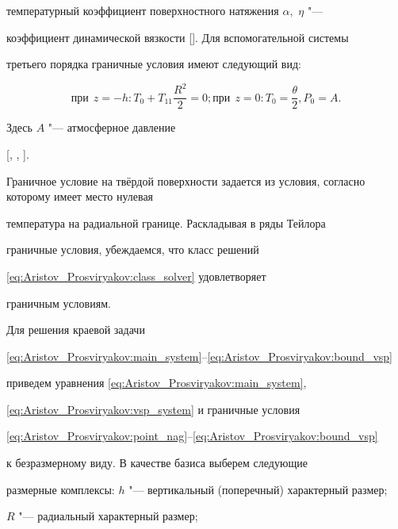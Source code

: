 температурный коэффициент поверхностного натяжения $\alpha,$ $\eta$ "---

коэффициент динамической вязкости []. Для вспомогательной системы

третьего порядка граничные условия имеют следующий вид:

\begin{equation}

\text{при} \ \ z=-h: T_0+T_{11}\frac{R^2}{2}=0;

\text{при} \ \ z=0: T_0=\frac{\theta}{2}, P_0=A.

\label{eq:Aristov_Prosviryakov:bound_vsp}

\end{equation}

Здесь $A$ "--- атмосферное давление

[, , ].

Граничное условие на твёрдой поверхности задается из условия, согласно которому имеет место нулевая

температура на радиальной границе. Раскладывая в ряды Тейлора

граничные условия, убеждаемся, что класс решений

\eqref{eq:Aristov_Prosviryakov:class_solver} удовлетворяет

граничным условиям.



\smallskip



 Для решения краевой задачи

\eqref{eq:Aristov_Prosviryakov:main_system}--\eqref{eq:Aristov_Prosviryakov:bound_vsp}

приведем уравнения \eqref{eq:Aristov_Prosviryakov:main_system},

\eqref{eq:Aristov_Prosviryakov:vsp_system} и граничные условия

\eqref{eq:Aristov_Prosviryakov:point_nag}--\eqref{eq:Aristov_Prosviryakov:bound_vsp}

к безразмерному виду. В качестве базиса выберем следующие

размерные комплексы: $h$ "--- вертикальный (поперечный) характерный размер;

$R$ "--- радиальный характерный размер;

